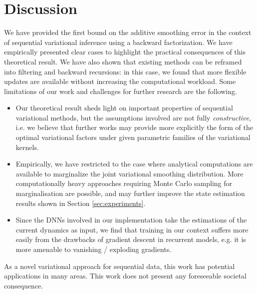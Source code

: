 \documentclass{article}
\begin{document}
\section{Discussion}
We have provided the first bound on the additive smoothing error in the context of sequential variational inference using a backward factorization. We have empirically presented clear cases to highlight the practical consequences of this theoretical result. We have also shown that existing methods can be reframed into filtering and backward recursions: in this case, we found that more flexible updates are available without increasing the computational workload. Some limitations of our work and challenges for further research are the following.
\begin{itemize}
    \item Our theoretical result sheds light on important properties of sequential variational methods, but the assumptions involved are not fully \textit{constructive}, i.e. we believe that further works may provide more explicitly the form of the optimal variational factors under given parametric families of the variational kernels. 
    \item Empirically, we have restricted to the case where analytical computations are available to marginalize the joint variational smoothing distribution. More computationally heavy approaches requiring Monte Carlo sampling for marginalisation are possible, and may further improve the state estimation results shown in Section \ref{sec:experiments}.
    \item Since the DNNs involved in our implementation take the estimations of the current dynamics as input, we find that training in our context suffers more easily from the drawbacks of gradient descent in recurrent models, e.g. it is more amenable to vanishing / exploding gradients.
\end{itemize}


As a novel variational approach for sequential data, this work has potential applications in many areas. This work does not present any foreseeable societal consequence.





\appendix
\end{document}
